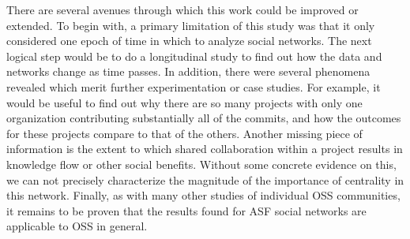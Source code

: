 There are several avenues through which this work could be improved or extended. To begin with, a primary limitation of this study was that it only considered one epoch of time in which to analyze social networks. The next logical step would be to do a longitudinal study to find out how the data and networks change as time passes. In addition, there were several phenomena revealed which merit further experimentation or case studies. For example, it would be useful to find out why there are so many projects with only one organization contributing substantially all of the commits, and how the outcomes for these projects compare to that of the others. Another missing piece of information is the extent to which shared collaboration within a project results in knowledge flow or other social benefits. Without some concrete evidence on this, we can not precisely characterize the magnitude of the importance of centrality in this network. Finally, as with many other studies of individual OSS communities, it remains to be proven that the results found for ASF social networks are applicable to OSS in general.